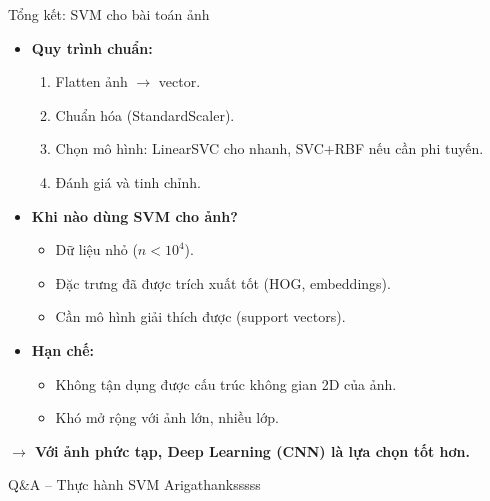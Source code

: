 \begin{frame}{Tổng kết: SVM cho bài toán ảnh}
  \begin{itemize}
    \item \textbf{Quy trình chuẩn:}
      \begin{enumerate}
        \item Flatten ảnh $\rightarrow$ vector.
        \item Chuẩn hóa (StandardScaler).
        \item Chọn mô hình: LinearSVC cho nhanh, SVC+RBF nếu cần phi tuyến.
        \item Đánh giá và tinh chỉnh.
      \end{enumerate}
    \item \textbf{Khi nào dùng SVM cho ảnh?}
      \begin{itemize}
        \item Dữ liệu nhỏ ($n < 10^4$).
        \item Đặc trưng đã được trích xuất tốt (HOG, embeddings).
        \item Cần mô hình giải thích được (support vectors).
      \end{itemize}
    \item \textbf{Hạn chế:}
      \begin{itemize}
        \item Không tận dụng được cấu trúc không gian 2D của ảnh.
        \item Khó mở rộng với ảnh lớn, nhiều lớp.
      \end{itemize}
  \end{itemize}
  \centering
  \textbf{$\rightarrow$ Với ảnh phức tạp, Deep Learning (CNN) là lựa chọn tốt hơn.}
\end{frame}

\begin{frame}{Q\&A – Thực hành SVM}
  \centering
  \Large
 Arigathanksssss \\
  \vspace{0.5cm}
  \normalsize
\end{frame}